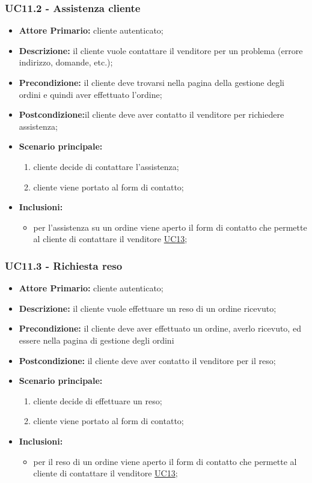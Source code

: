 \subsubsection{UC11.2 - Assistenza cliente}
\label{UC11.2}
\begin{itemize}
\item \textbf{Attore Primario:} cliente autenticato;
\item \textbf{Descrizione:} il cliente vuole contattare il venditore per un problema (errore indirizzo, domande, etc.);
\item \textbf{Precondizione:} il cliente deve trovarsi nella pagina della gestione degli ordini e quindi aver effettuato l'ordine;
\item \textbf{Postcondizione:}il cliente deve aver contatto il venditore per richiedere assistenza;
\item \textbf{Scenario principale:}
\begin{enumerate}
    \item cliente decide di contattare l'assistenza;
    \item cliente viene portato al form di contatto;
\end{enumerate}
\item \textbf{Inclusioni:}
\begin{itemize}
    \item per l'assistenza su un ordine viene aperto il form di contatto che permette al cliente di contattare il venditore \hyperref[UC13]{UC13};
\end{itemize}
\end{itemize}

\subsubsection{UC11.3 - Richiesta reso}
\label{UC11.3}
\begin{itemize}
\item \textbf{Attore Primario:} cliente autenticato;
\item \textbf{Descrizione:} il cliente vuole effettuare un reso di un ordine ricevuto;
\item \textbf{Precondizione:} il cliente deve aver effettuato un ordine, averlo ricevuto, ed essere nella pagina di gestione degli ordini
\item \textbf{Postcondizione:} il cliente deve aver contatto il venditore per il reso;
\item \textbf{Scenario principale:}
\begin{enumerate}
    \item cliente decide di effettuare un reso;
    \item cliente viene portato al form di contatto;
\end{enumerate}
\item \textbf{Inclusioni:}
\begin{itemize}
    \item per il reso di un ordine viene aperto il form di contatto che permette al cliente di contattare il venditore \hyperref[UC13]{UC13};
\end{itemize}
\end{itemize}

